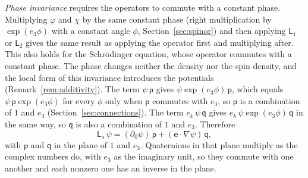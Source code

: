 \documentclass[aps,prd,onecolumn,tightenlines,nofootinbib,notitlepage,11pt,floatfix]{revtex4-2}
\theoremstyle{indentedtheorem}
\begin{document}
\emph{Phase invariance} requires the operators to commute with a constant phase. Multiplying $\varphi$ and $\chi$ by the same constant phase (right multiplication by $\exp(e_3\phi)$ with a constant angle $\phi$, Section~\ref{sec:spinor}) and then applying $\mathsf{L}_1$ or $\mathsf{L}_2$ gives the same result as applying the operator first and multiplying after. This also holds for the Schr\"odinger equation, whose operator commutes with a constant phase. The phase changes neither the density nor the spin density, and the local form of this invariance introduces the potentials (Remark~\ref{rem:additivity}). The term $\psi\,\mathsf{p}$ gives $\psi\exp(e_3\phi)\,\mathsf{p}$, which equals $\psi\,\mathsf{p}\exp(e_3\phi)$ for every $\phi$ only when $\mathsf{p}$ commutes with $e_3$, so $\mathsf{p}$ is a combination of $1$ and $e_3$ (Section~\ref{sec:connections}). The term $e_k\,\psi\,\mathsf{q}$ gives $e_k\,\psi\exp(e_3\phi)\,\mathsf{q}$ in the same way, so $\mathsf{q}$ is also a combination of $1$ and $e_3$. Therefore
\begin{equation}
    \mathsf{L}_a \, \psi = (\partial_0\psi) \, \mathsf{p} + (\mathbf{e}\cdot\nabla\psi) \, \mathsf{q} ,
    \label{eq:first_order_general}
\end{equation}
with $\mathsf{p}$ and $\mathsf{q}$ in the plane of $1$ and $e_3$. Quaternions in that plane multiply as the complex numbers do, with $e_3$ as the imaginary unit, so they commute with one another and each nonzero one has an inverse in the plane.
\end{document}
